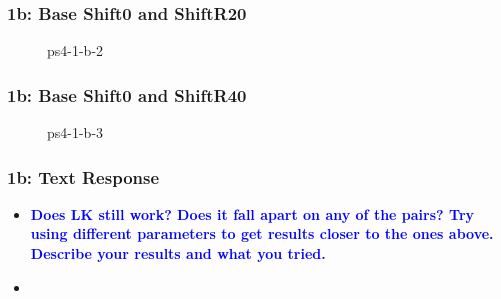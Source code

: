 \documentclass[../report.tex]{subfiles}
\begin{document}
    \begin{frame}
        \frametitle{1b: Base Shift0 and ShiftR20}
        \begin{figure}[!htb]
            \centering
            \caption{ps4-1-b-2}
        \end{figure}
    \end{frame}

    \begin{frame}
        \frametitle{1b: Base Shift0 and ShiftR40}
        \begin{figure}[!htb]
            \centering
            \caption{ps4-1-b-3}
        \end{figure}
    \end{frame}

    \begin{frame}[t]
        \frametitle{1b: Text Response}
        \begin{normalsize}
            \begin{itemize}
                \setlength\itemsep{1em}\fontsize{6pt}{6pt}

                \item[]{\textbf{\selectfont\textcolor{blue}{ Does LK still work? Does it fall apart on any of the pairs? Try using different parameters to get results closer to the ones above. Describe your results and what you tried. }}}
                
                \item[]\textbf{}
                
            \end{itemize}
        \end{normalsize}
    \end{frame}
    
\end{document}
